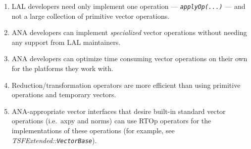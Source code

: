\documentclass[pdf,ps2pdf,11pt]{SANDreport}
\begin{document}
\begin{enumerate}
\item
LAL developers need only implement one operation ---
{}\textit{\texttt{applyOp(\-...)}} --- and not a large collection of
primitive vector operations.
\item
ANA developers can implement {}\textit{specialized} vector operations
without needing any support from LAL maintainers.
\item
ANA developers can optimize time consuming vector operations on their
own for the platforms they work with.
\item
Reduction/transformation operators are more efficient than using
primitive operations and temporary vectors.
\item
ANA-appropriate vector interfaces that desire built-in standard vector
operations (i.e.~axpy and norms) can use RTOp operators for the
implementations of these operations (for example, see
{}\textit{TSFExtended\-::\texttt{Vector\-Base}}).
\end{enumerate}
\end{document}
